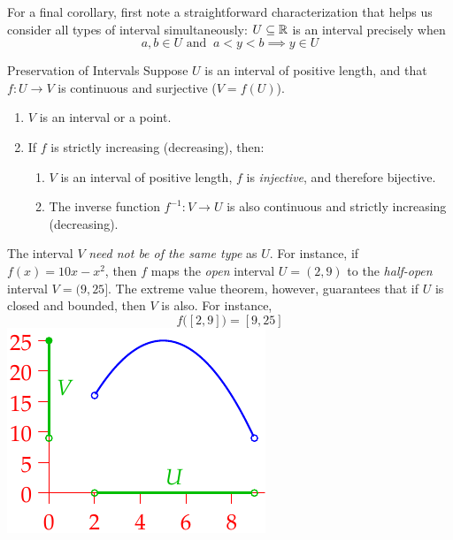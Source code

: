 \goodbreak


For a final corollary, first note a straightforward characterization that helps us consider all types of interval simultaneously: $U\subseteq\mathbb{R}$ is an interval precisely when
\[
	a,b\in U \text{ and }\ a<y<b\implies y\in U \tag{$\ast$}
\]

\begin{cor}{Preservation of Intervals}{}
	Suppose $U$ is an interval of positive length, and that $f:U\to V$ is continuous and surjective ($V=f(U)$).\vspace{-1pt}
	\begin{enumerate}\itemsep0pt
	  \item $V$ is an interval or a point.
	  \item If $f$ is strictly increasing (decreasing), then:\vspace{-3pt}
		\begin{enumerate}
		  \item $V$ is an interval of positive length, $f$ is \emph{injective}, and therefore bijective.
		  \item The inverse function $f^{-1}:V\to U$ is also continuous and strictly increasing (decreasing).
		\end{enumerate}
	\end{enumerate}
\end{cor}

\begin{example}[lower separated=false, sidebyside, sidebyside align=top seam, sidebyside gap=0pt, righthand width=0.3\linewidth]{}{}
	The interval $V$ \emph{need not be of the same type} as $U$. For instance, if $f(x)=10x-x^2$, then $f$ maps the \emph{open} interval $U=(2,9)$ to the \emph{half-open} interval $V=(9,25]$.\smallbreak
	The extreme value theorem, however, guarantees that if $U$ is closed and bounded, then $V$ is also. For instance,
	\[
		f\bigl([2,9]\bigr)=[9,25]
	\]
	\tcblower
	\flushright\includegraphics[scale=0.95]{intval4}
\end{example}


